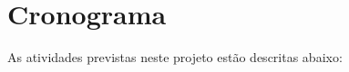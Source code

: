 \documentclass[
    12pt,               %
    openright,          %
    twoside,            %
    a4paper,            %
    english,            %
    brazil,             %
    ]{abntex2}
\begin{document}





\chapter{Cronograma}
\label{cap:cronograma}

    As atividades previstas neste projeto estão descritas abaixo:
\end{document}
